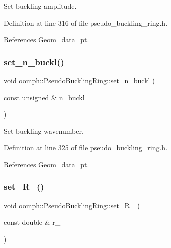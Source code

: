 Set buckling amplitude. 



Definition at line 316 of file pseudo\+\_\+buckling\+\_\+ring.\+h.



References Geom\+\_\+data\+\_\+pt.

\mbox{\label{classoomph_1_1PseudoBucklingRing_ac52faed0469827fc629abd7de267262f}} 
\subsubsection{\texorpdfstring{set\+\_\+n\+\_\+buckl()}{set\_n\_buckl()}}
{\footnotesize\ttfamily void oomph\+::\+Pseudo\+Buckling\+Ring\+::set\+\_\+n\+\_\+buckl (\begin{DoxyParamCaption}\item[{const unsigned \&}]{n\+\_\+buckl }\end{DoxyParamCaption})\hspace{0.3cm}{\ttfamily [inline]}}



Set buckling wavenumber. 



Definition at line 325 of file pseudo\+\_\+buckling\+\_\+ring.\+h.



References Geom\+\_\+data\+\_\+pt.

\mbox{\label{classoomph_1_1PseudoBucklingRing_a348dbc5d192cb5a162448420bd7a185e}} 
\subsubsection{\texorpdfstring{set\+\_\+\+R\+\_()}{set\_R\_0()}}
{\footnotesize\ttfamily void oomph\+::\+Pseudo\+Buckling\+Ring\+::set\+\_\+\+R\+\_ (\begin{DoxyParamCaption}\item[{const double \&}]{r\+\_ }\end{DoxyParamCaption})\hspace{0.3cm}{\ttfamily [inline]}}



